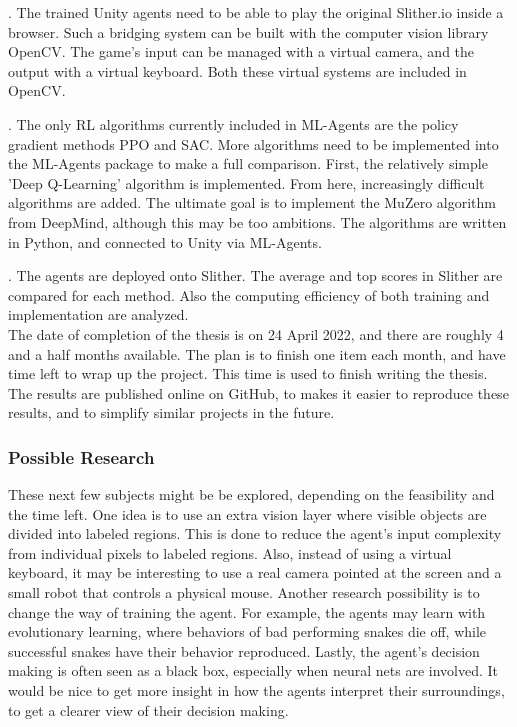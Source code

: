 . The trained Unity agents need to be able to play the original Slither.io inside a browser. Such a bridging system can be built with the computer vision library OpenCV. The game's input can be managed with a virtual camera, and the output with a virtual keyboard. Both these virtual systems are included in OpenCV.

. The only RL algorithms currently included in ML-Agents are the policy gradient methods PPO and SAC. More algorithms need to be implemented into the ML-Agents package to make a full comparison. First, the relatively simple 'Deep Q-Learning' algorithm is implemented. From here, increasingly difficult algorithms are added. The ultimate goal is to implement the MuZero algorithm from DeepMind, although this may be too ambitions. The algorithms are written in Python, and connected to Unity via ML-Agents.

. The agents are deployed onto Slither. The average and top scores in Slither are compared for each method. Also the computing efficiency of both training and implementation are analyzed.
\\[2.5mm] \noindent
The date of completion of the thesis is on 24 April 2022, and there are roughly 4 and a half months available. The plan is to finish one item each month, and have time left to wrap up the project. This time is used to finish writing the thesis. The results are published online on GitHub, to makes it easier to reproduce these results, and to simplify similar projects in the future.


\subsubsection{Possible Research}
These next few subjects might be be explored, depending on the feasibility and the time left. One idea is to use an extra vision layer where visible objects are divided into labeled regions. This is done to reduce the agent's input complexity from individual pixels to labeled regions. Also, instead of using a virtual keyboard, it may be interesting to use a real camera pointed at the screen and a small robot that controls a physical mouse. Another research possibility is to change the way of training the agent. For example, the agents may learn with evolutionary learning, where behaviors of bad performing snakes die off, while successful snakes have their behavior reproduced. Lastly, the agent's decision making is often seen as a black box, especially when neural nets are involved. It would be nice to get more insight in how the agents interpret their surroundings, to get a clearer view of their decision making.






